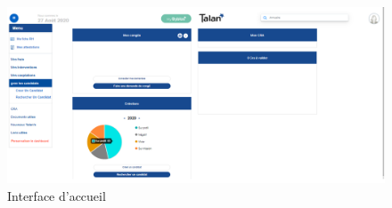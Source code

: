 \begin{figure}[H]
     \centering
     \includegraphics[scale=0.5]{img/capture accueil 2.png}
     \caption{Interface d'accueil}
     \label{fig:capture_accueil}
 \end{figure}
